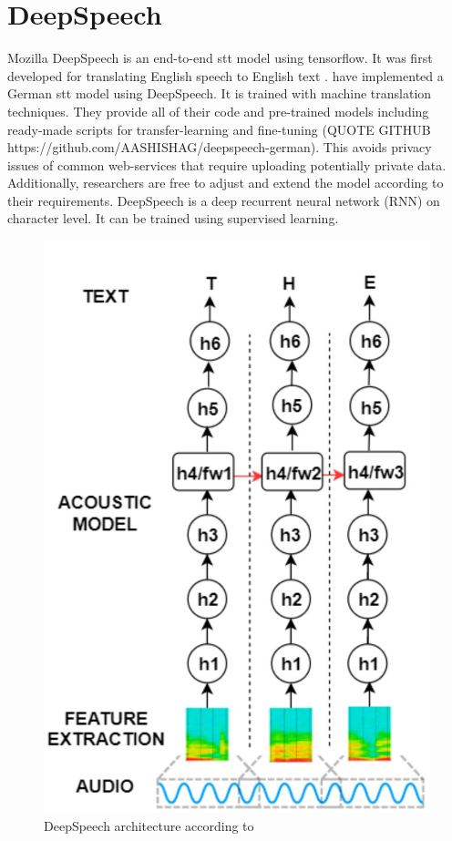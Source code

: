 \section{DeepSpeech}
Mozilla DeepSpeech is an end-to-end \gls{stt} model using tensorflow. It was first developed for translating English speech to English text \cite{Hannun2014DeepSS}. \citet{Agarwal2019GermanES} have implemented a German \gls{stt} model using DeepSpeech. It is trained with machine translation techniques. They provide all of their code and pre-trained models including ready-made scripts for transfer-learning and fine-tuning (QUOTE GITHUB https://github.com/AASHISHAG/deepspeech-german). This avoids privacy issues of common web-services that require uploading potentially private data. Additionally, researchers are free to adjust and extend the model according to their requirements. DeepSpeech is a deep recurrent neural network (RNN) on character level. It can be trained using supervised learning. 

\begin{figure}[h]
\includegraphics[scale=0.7]{deepspeech-de}
\caption{DeepSpeech architecture according to \citet{Agarwal2019GermanES}}
\label{architecture}
\end{figure}

